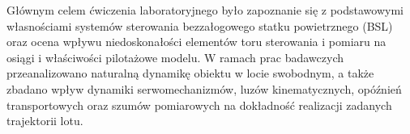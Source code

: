 \akapit  Głównym celem ćwiczenia laboratoryjnego było zapoznanie się z podstawowymi własnościami systemów sterowania bezzałogowego statku powietrznego (BSL) oraz ocena wpływu niedoskonałości elementów toru sterowania i pomiaru na osiągi i właściwości pilotażowe modelu. W ramach prac badawczych przeanalizowano naturalną dynamikę obiektu w locie swobodnym, a także zbadano wpływ dynamiki serwomechanizmów, luzów kinematycznych, opóźnień transportowych oraz szumów pomiarowych na dokładność realizacji zadanych trajektorii lotu.
